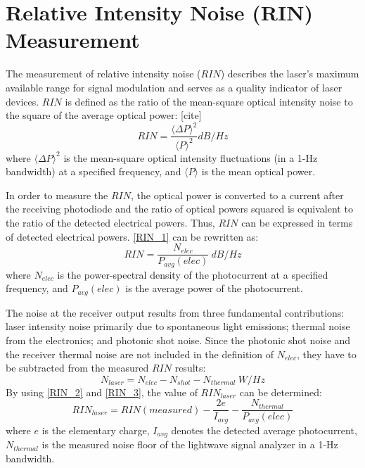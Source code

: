 \section{Relative Intensity Noise (RIN) Measurement}\label{sec:RIN_measurement}
The measurement of relative intensity noise ($RIN$) describes the laser’s maximum available range for signal modulation and serves as a quality indicator of laser devices. $RIN$ is defined as the ratio of the mean-square optical intensity noise to the square of the average optical power: [cite]
\begin{equation}
    RIN=\frac{\langle \Delta P \rangle ^2}{\langle P \rangle ^2}dB/Hz
\label{RIN_1}
\end{equation}
where $\langle \Delta P \rangle ^2$ is the mean-square optical intensity fluctuations (in a 1-Hz bandwidth) at a specified frequency, and $\langle P \rangle$ is the mean optical power.

In order to measure the $RIN$, the optical power is converted to a current after the receiving photodiode and the ratio of optical powers squared is equivalent to the ratio of the detected electrical powers. Thus, $RIN$ can be expressed in terms of detected electrical powers. \autoref{RIN_1} can be rewritten as:
\begin{equation}
    RIN=\frac{N_{elec}}{P_{avg}(elec)} \ dB/Hz
    \label{RIN_2}
\end{equation}
where $N_{elec}$ is the power-spectral density of the photocurrent at a specified frequency, and $P_{avg}(elec)$ is the average power of the photocurrent.

The noise at the receiver output results from three fundamental contributions: laser intensity noise primarily due to spontaneous light emissions; thermal noise from the electronics; and photonic shot noise. Since the photonic shot noise and the receiver thermal noise are not included in the definition of $N_{elec}$, they have to be subtracted from the measured $RIN$ results:
\begin{equation}
    N_{laser}=N_{elec}-N_{shot}-N_{thermal} \ W/Hz
    \label{RIN_3}
\end{equation}
By using \autoref{RIN_2} and \autoref{RIN_3}, the value of $RIN_{laser}$ can be determined:
\begin{equation}
    RIN_{laser}=RIN(measured)-\frac{2e}{I_{avg}}-\frac{N_{thermal}}{P_{avg}(elec)}
\end{equation}
where $e$ is the elementary charge, $I_{avg}$ denotes the detected average photocurrent, $N_{thermal}$ is the measured noise floor of the lightwave signal analyzer in a 1-Hz bandwidth.

